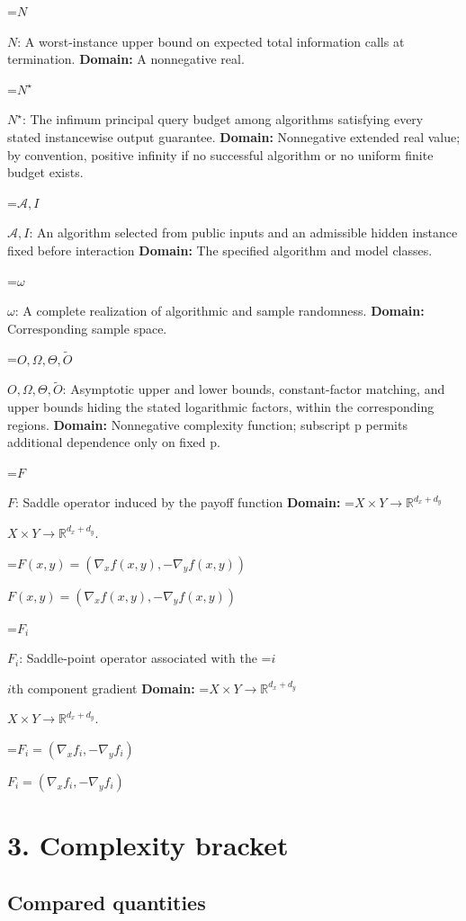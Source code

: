 \documentclass[10pt,a4paper]{article}
\newcommand{\AtlasMath}[1]{\par\begingroup\centering\setbox0=\hbox{$\displaystyle #1$}\ifdim\wd0>1.4\linewidth\typeout{ATLAS WIDE FORMULA: \the\wd0}\fi\ifdim\wd0>\linewidth\resizebox{\linewidth}{!}{\box0}\else\box0\fi\par\endgroup}
\newcommand{\AtlasInlineMath}[1]{\begingroup\setbox0=\hbox{$#1$}\ifdim\wd0>.4\linewidth\endgroup\AtlasMath{#1}\else\endgroup$#1$\fi}
\begin{document}
\AtlasInlineMath{N}: A worst-instance upper bound on expected total information calls at termination. \textbf{Domain:} A nonnegative real.



\AtlasInlineMath{N^\star}: The infimum principal query budget among algorithms satisfying every stated instancewise output guarantee. \textbf{Domain:} Nonnegative extended real value; by convention, positive infinity if no successful algorithm or no uniform finite budget exists.



\AtlasInlineMath{\mathcal A,I}: An algorithm selected from public inputs and an admissible hidden instance fixed before interaction \textbf{Domain:} The specified algorithm and model classes.



\AtlasInlineMath{\omega}: A complete realization of algorithmic and sample randomness. \textbf{Domain:} Corresponding sample space.



\AtlasInlineMath{O,\Omega,\Theta,\widetilde O}: Asymptotic upper and lower bounds, constant-factor matching, and upper bounds hiding the stated logarithmic factors, within the corresponding regions. \textbf{Domain:} Nonnegative complexity function; subscript p permits additional dependence only on fixed p.



\AtlasInlineMath{F}: Saddle operator induced by the payoff function \textbf{Domain:} \AtlasInlineMath{X\times Y\to\mathbb R^{d_x+d_y}}.



\AtlasInlineMath{F(x,y)=(\nabla_xf(x,y),-\nabla_yf(x,y))}



\AtlasInlineMath{F_i}: Saddle-point operator associated with the \AtlasInlineMath{i}th component gradient \textbf{Domain:} \AtlasInlineMath{X\times Y\to\mathbb R^{d_x+d_y}}.



\AtlasInlineMath{F_i=(\nabla_xf_i,-\nabla_yf_i)}



\section{3. Complexity bracket}


\subsection{Compared quantities}
\end{document}
